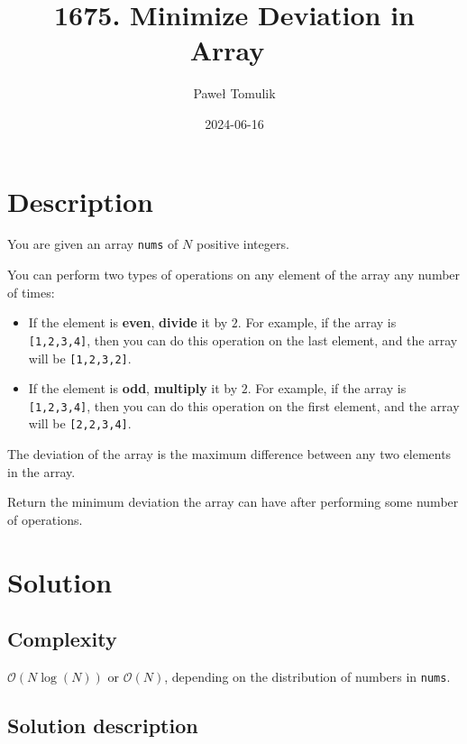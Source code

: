 \documentclass[paper=a4,parskip=half,DIV=12]{leetcode}
\begin{document}
\title{1675. Minimize Deviation in Array~\cite{leetcode:1675}}
\subtitle{}
\author{Paweł Tomulik}
\date{2024-06-16}
\maketitle

\section{Description}
\label{sec:description}

You are given an array \texttt{nums} of $N$ positive integers.

You can perform two types of operations on any element of the array any number
of times:

\begin{itemize}
  \item If the element is \textbf{even}, \textbf{divide} it by $2$. For example, if
    the array is \texttt{[1,2,3,4]}, then you can do this operation on the
    last element, and the array will be \texttt{[1,2,3,2]}.
  \item
    If the element is \textbf{odd}, \textbf{multiply} it by $2$. For example,
    if the array is \texttt{[1,2,3,4]}, then you can do this operation on the first
    element, and the array will be \texttt{[2,2,3,4]}.
\end{itemize}
The deviation of the array is the maximum difference between any two elements
in the array.

Return the minimum deviation the array can have after performing some number of
operations.

\section{Solution}
\label{sec:solution}

\subsection{Complexity}
\label{sec:complexity}

$\mathcal{O}(N \log{(N)})$ or $\mathcal{O}(N)$, depending on the distribution of numbers in \texttt{nums}.

\subsection{Solution description}
\label{sec:solution-description}
\end{document}
